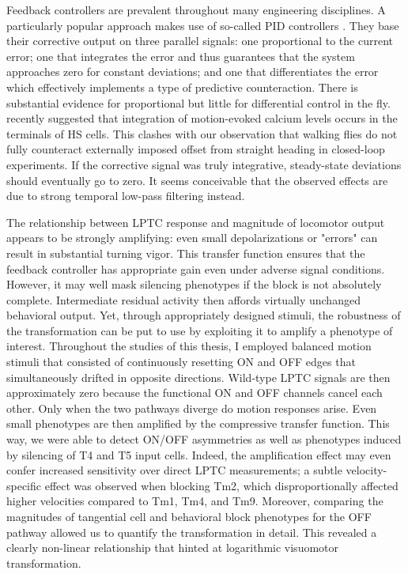 Feedback controllers are prevalent throughout many engineering disciplines. A particularly popular approach makes use of so-called PID controllers \citep{Astrom:2008aa}. They base their corrective output on three parallel signals: one proportional to the current error; one that integrates the error and thus guarantees that the system approaches zero for constant deviations; and one that differentiates the error which effectively implements a type of predictive counteraction. There is substantial evidence for proportional but little for differential control in the fly. \citet{Schnell:2014hs} recently suggested that integration of motion-evoked calcium levels occurs in the terminals of HS cells. This clashes with our observation that walking flies do not fully counteract externally imposed offset from straight heading in closed-loop experiments. If the corrective signal was truly integrative, steady-state deviations should eventually go to zero. It seems conceivable that the observed effects are due to strong temporal low-pass filtering instead.


The relationship between LPTC response and magnitude of locomotor output appears to be strongly amplifying: even small depolarizations or "errors" can result in substantial turning vigor. This transfer function ensures that the feedback controller has appropriate gain even under adverse signal conditions. However, it may well mask silencing phenotypes if the block is not absolutely complete. Intermediate residual activity then affords virtually unchanged behavioral output. Yet, through appropriately designed stimuli, the robustness of the transformation can be put to use by exploiting it to amplify a phenotype of interest. Throughout the studies of this thesis, I employed balanced motion stimuli \citep[modified from][]{Clark:2011gw} that consisted of continuously resetting ON and OFF edges that simultaneously drifted in opposite directions. Wild-type LPTC signals are then approximately zero because the functional ON and OFF channels cancel each other. Only when the two pathways diverge do motion responses arise. Even small phenotypes are then amplified by the compressive transfer function. This way, we were able to detect ON/OFF asymmetries as well as phenotypes induced by silencing of T4 and T5 input cells. Indeed, the amplification effect may even confer increased sensitivity over direct LPTC measurements; a subtle velocity-specific effect was observed when blocking Tm2, which disproportionally affected higher velocities compared to Tm1, Tm4, and Tm9. Moreover, comparing the magnitudes of tangential cell and behavioral block phenotypes for the OFF pathway allowed us to quantify the transformation in detail. This revealed a clearly non-linear relationship that hinted at logarithmic visuomotor transformation.

